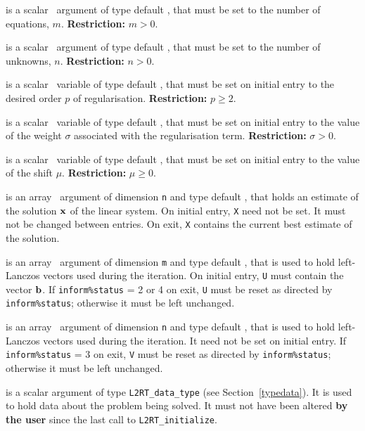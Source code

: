 \documentclass{galahad}
\newcommand{\packagename}{L2\-RT}
\begin{document}
\begin{description}

 is a scalar \intentin\ argument of type default \integer, that must be 
set to the number of equations, $m$. {\bf Restriction: } $m > 0$. 
 
 is a scalar \intentin\ argument of type default \integer, that must be 
set to the number of unknowns, $n$. {\bf Restriction: } $n > 0$. 
 
 is a scalar \intentin\ variable of type default 
\realdp, 
that must be set on initial entry to the desired order $p$ of regularisation.
{\bf Restriction: } $p \geq 2$. 

 is a scalar \intentin\ variable of type default 
\realdp, 
that must be set on initial entry
to the value of the weight $\sigma$ associated with the regularisation term.
{\bf Restriction: } $\sigma > 0$. 
 
 is a scalar \intentin\ variable of type default 
\realdp, 
that must be set on initial entry to the value of the shift $\mu$.
{\bf Restriction: } $\mu \geq 0$. 
 
 is an array \intentinout\ argument of dimension {\tt n} and  
type default \realdp,  
that holds an estimate of the solution ${\mathbf{x}}$ of the linear system. 
On initial entry, {\tt X} need not be set. 
It must not be changed between entries. 
On exit, {\tt X} contains the current best estimate of the solution. 
 
 is an array \intentinout\ argument of dimension {\tt m} and  
type default \realdp,  
that is used to hold left-Lanczos vectors used during the iteration.
On initial entry, {\tt U} must contain the vector ${\mathbf{b}}$.  
If {\tt inform\%status} = 2 or 4 on exit, {\tt U} must be reset
as directed by  {\tt inform\%status}; otherwise  
it must be left unchanged. 
 
 is an array \intentinout\ argument of dimension {\tt n} and  
type default \realdp,  
that is used to hold left-Lanczos vectors used during the iteration.
It need not be set on initial entry.
If {\tt inform\%status} = 3 on exit, {\tt V} must be reset
as directed by  {\tt inform\%status}; otherwise it must be left unchanged. 
 
 is a scalar \intentinout argument of type 
{\tt \packagename\_data\_type}
(see Section~\ref{typedata}). It is used to hold data about the problem being 
solved. It must not have been altered {\bf by the user} since the last call to 
{\tt \packagename\_initialize}.


\end{description}
\end{document}
